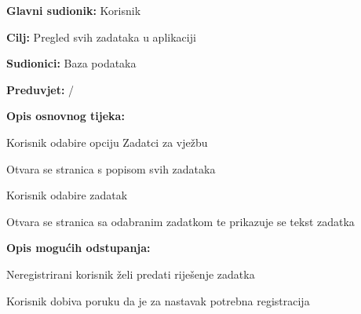 					
					\noindent {}
					\begin{packed_item}
						
						\item \textbf{Glavni sudionik: }Korisnik
						\item  \textbf{Cilj:} Pregled svih zadataka u aplikaciji
						\item  \textbf{Sudionici:} Baza podataka
						\item  \textbf{Preduvjet:} /
						\item  \textbf{Opis osnovnog tijeka:}
						
						\item[] \begin{packed_enum}
							
							\item Korisnik odabire opciju Zadatci za vježbu
							\item Otvara se stranica s popisom svih zadataka
							\item Korisnik odabire zadatak
							\item Otvara se stranica sa odabranim zadatkom te prikazuje se tekst zadatka 
						\end{packed_enum}
						
						\item  \textbf{Opis mogućih odstupanja:}
						
						\item[] \begin{packed_item}
							
							\item[4.a] Neregistrirani korisnik želi predati riješenje zadatka 
							\item[] \begin{packed_enum}
								
								\item Korisnik dobiva poruku da je za nastavak potrebna registracija
								
							\end{packed_enum}
							
						\end{packed_item}
					\end{packed_item}
					

